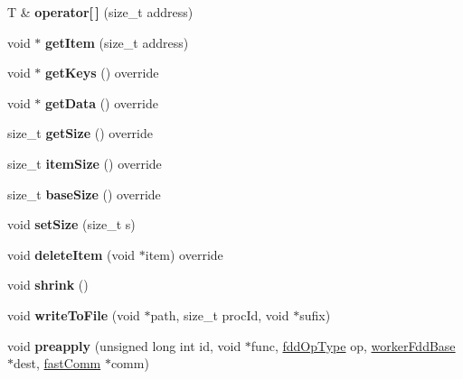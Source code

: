\begin{DoxyCompactItemize}
\hypertarget{classfaster_1_1workerFddCore_ad93c9c3c5836ab3bf5a8bc425d976211}{}\label{classfaster_1_1workerFddCore_ad93c9c3c5836ab3bf5a8bc425d976211} 
T \& {\bfseries operator\mbox{[}$\,$\mbox{]}} (size\+\_\+t address)
\item 
\hypertarget{classfaster_1_1workerFddCore_a7753b4b41fa7c87676f7a6ef75a125cb}{}\label{classfaster_1_1workerFddCore_a7753b4b41fa7c87676f7a6ef75a125cb} 
void $\ast$ {\bfseries get\+Item} (size\+\_\+t address)
\item 
\hypertarget{classfaster_1_1workerFddCore_ae3768cc9c330c25c669611b5df3c5454}{}\label{classfaster_1_1workerFddCore_ae3768cc9c330c25c669611b5df3c5454} 
void $\ast$ {\bfseries get\+Keys} () override
\item 
\hypertarget{classfaster_1_1workerFddCore_a77172c15f3409bbe233be13aabfe8071}{}\label{classfaster_1_1workerFddCore_a77172c15f3409bbe233be13aabfe8071} 
void $\ast$ {\bfseries get\+Data} () override
\item 
\hypertarget{classfaster_1_1workerFddCore_a32bd4aca33e352d018a3bde34e7104d2}{}\label{classfaster_1_1workerFddCore_a32bd4aca33e352d018a3bde34e7104d2} 
size\+\_\+t {\bfseries get\+Size} () override
\item 
\hypertarget{classfaster_1_1workerFddCore_a68f16ce63e3bda36270a9f096e7bf007}{}\label{classfaster_1_1workerFddCore_a68f16ce63e3bda36270a9f096e7bf007} 
size\+\_\+t {\bfseries item\+Size} () override
\item 
\hypertarget{classfaster_1_1workerFddCore_aa56e4f3c789781c5e5745cb1a9f55032}{}\label{classfaster_1_1workerFddCore_aa56e4f3c789781c5e5745cb1a9f55032} 
size\+\_\+t {\bfseries base\+Size} () override
\item 
\hypertarget{classfaster_1_1workerFddCore_ae6834075d00c10b68b4ed8dc56a43ff1}{}\label{classfaster_1_1workerFddCore_ae6834075d00c10b68b4ed8dc56a43ff1} 
void {\bfseries set\+Size} (size\+\_\+t s)
\item 
\hypertarget{classfaster_1_1workerFddCore_aece15833d979a1315018b17426f9f943}{}\label{classfaster_1_1workerFddCore_aece15833d979a1315018b17426f9f943} 
void {\bfseries delete\+Item} (void $\ast$item) override
\item 
\hypertarget{classfaster_1_1workerFddCore_a9e9247a366e0a1e1b60c759ff9badb5c}{}\label{classfaster_1_1workerFddCore_a9e9247a366e0a1e1b60c759ff9badb5c} 
void {\bfseries shrink} ()
\item 
\hypertarget{classfaster_1_1workerFddCore_aba13e77488bcc84daaed00c0fb899eae}{}\label{classfaster_1_1workerFddCore_aba13e77488bcc84daaed00c0fb899eae} 
void {\bfseries write\+To\+File} (void $\ast$path, size\+\_\+t proc\+Id, void $\ast$sufix)
\item 
\hypertarget{classfaster_1_1workerFddCore_a4533454652b609e0cedb026ad1d3e881}{}\label{classfaster_1_1workerFddCore_a4533454652b609e0cedb026ad1d3e881} 
void {\bfseries preapply} (unsigned long int id, void $\ast$func, \hyperlink{namespacefaster_a64379512d12d41c6e58f176939abfd80}{fdd\+Op\+Type} op, \hyperlink{classfaster_1_1workerFddBase}{worker\+Fdd\+Base} $\ast$dest, \hyperlink{classfaster_1_1fastComm}{fast\+Comm} $\ast$comm)
\end{DoxyCompactItemize}
